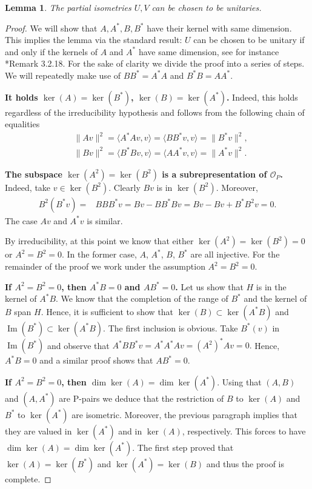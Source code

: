 \documentclass[12pt, a4paper]{amsart}
\def\ker{\operatorname{ker}}
\def\dim{\operatorname{dim}}
\def\Im{\operatorname{Im}}
\newcommand{\CO}[0]{\mathcal{O}} \newcommand{\CP}[0]{\mathcal{P}}
\newtheorem{lemma}[theorem]{Lemma}
\numberwithin{equation}{section}
\begin{document}
\begin{lemma}
The partial isometries $U,V$ can be chosen to be \emph{unitaries}.    
\end{lemma}
\begin{proof}
We will show that $A,A^*,B,B^*$ have their kernel with same dimension.
This implies the lemma via the standard result: $U$ can be chosen to be unitary if and only if the kernels of $A$ and $A^*$ have same dimension, see for instance \cite{Pedersen}*{Remark 3.2.18}. 
For the sake of clarity we divide the proof into a series of steps.
We will repeatedly make use of $BB^*=A^*A$ and $B^*B=AA^*$.

\textbf{It holds $\ker (A)=\ker (B^*)$, $\ker (B)=\ker (A^*)$.} Indeed, this holds regardless of the irreducibility hypothesis and follows from the following chain of equalities
\begin{align*}
&\| Av\|^2 =\langle A^*Av,v\rangle = \langle BB^*v,v\rangle = \| B^*v\|^2,\\
&\| Bv\|^2 =\langle B^*Bv,v\rangle = \langle AA^*v,v\rangle = \| A^*v\|^2.
\end{align*}

\textbf{The subspace $\ker (A^2)=\ker (B^2)$ is a subrepresentation of $\CO_P$.} Indeed, take $v\in \ker (B^2)$. Clearly $Bv$ is in $\ker (B^2)$. Moreover, 
\begin{align*}
B^2(B^*v)= & BBB^*v= Bv-BB^*Bv=Bv-Bv+B^*B^2v=0.
\end{align*}
The case $Av$ and $A^*v$ is similar. 

By irreducibility, at this point we know that either
$\ker (A^2)=\ker (B^2)=0$ or
$A^2=B^2=0$. In the former case, $A$, $A^*$, $B$, $B^*$ are all injective. 
For the remainder of the proof we work under the assumption $A^2=B^2=0$.

\textbf{If $A^2=B^2=0$, then $A^*B=0$ and $AB^*=0$.} 
Let us show that $H$ is in the kernel of $A^*B$. We know that the completion of the range of $B^*$ and the kernel of $B$ span $H$. 
Hence, it is sufficient to show that $\ker(B)\subset \ker(A^*B)$ and $\Im(B^*)\subset \ker(A^*B).$
The first inclusion is obvious. 
Take $B^*(v)$ in $\Im(B^*)$ and observe that $A^*BB^*v=A^*A^*Av=(A^2)^*Av=0.$
Hence, $A^*B=0$ and a similar proof shows that $AB^*=0$.

\textbf{If $A^2=B^2=0$, then $\dim \ker (A) = \dim\ker (A^*)$}. 
Using that $(A,B)$ and $(A,A^*)$ are P-pairs we deduce that the restriction of $B$ to $\ker(A)$ and $B^*$ to $\ker(A^*)$ are isometric.
Moreover, the previous paragraph implies that they are valued in $\ker(A^*)$ and in $\ker(A)$, respectively.
This forces to have $\dim\ker(A)=\dim\ker(A^*).$
The first step proved that $\ker(A)=\ker(B^*)$ and $\ker(A^*)=\ker(B)$ and thus the proof is complete.
\end{proof}
\end{document}
